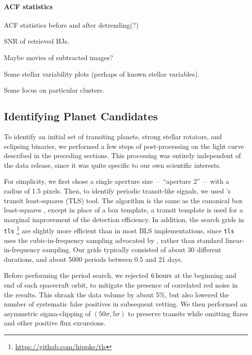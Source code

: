 \documentclass[12pt,twocolumn,tighten]{aastex62}
\begin{document}
\paragraph{ACF statistics}
ACF statistics before and after detrending(?)

SNR of retrieved HJs.

Maybe movies of subtracted images?

Some stellar variability plots (perhaps of known stellar variables).

Some focus on particular clusters.

\subsection{Identifying Planet Candidates}
\label{subsec:identifying_ctois}

To identify an initial set of transiting planets, strong stellar rotators, and 
eclipsing binaries, we performed a few steps of post-processing on the light 
curve described in the preceding sections. 
This processing was entirely independent of the data release, since it was 
quite specific to our own scientific interests.

For simplicity,
we first chose a single aperture size~--~``aperture 2''~--~with a radius of 
1.5  pixels.
Then, to identify periodic transit-like signals, we used 
\citet{hippke_TLS_2019}'s transit least-squares (TLS) tool.
The algorithm is the same as the canonical box least-squares
\citep{kovacs_box-fitting_2002}, except in place of a box template, a transit 
template is used  for a marginal improvement of the detection efficiency.
In addition, the search grids in \texttt{tls} 
\footnote{\url{https://github.com/hippke/tls}} are slightly more 
efficient than in most BLS implementations, since \texttt{tls} uses the 
cubic-in-frequency sampling advocated by \citet{ofir_optimizing_2014}, 
rather than standard linear-in-frequency sampling.
Our grids typically consisted of about 30 different durations, and
about 5000 periods between 0.5 and 21 days. 

Before performing the period search, we rejected $6\,{\rm hours}$ at the
beginning and end of each spacecraft orbit, to mitigate the presence
of correlated red noise in the results.
This shrank the data volume by about 5\%, but also lowered the number
of systematic false positives in subsequent vetting.
We then performed an asymmetric sigma-clipping of $(50\sigma,5\sigma)$ to 
preserve transits while omitting flares and other positive flux excursions. 
\end{document}
